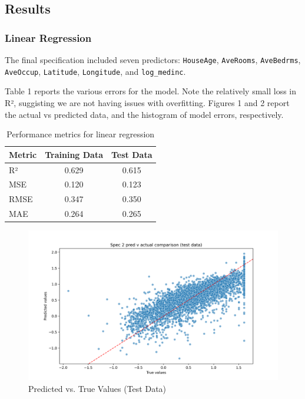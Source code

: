 \documentclass[letterpaper, 11pt]{amsart}
\begin{document}
\subsection{Results}

\subsubsection{Linear Regression}
The final specification included seven predictors: \texttt{HouseAge}, \texttt{AveRooms}, \texttt{AveBedrms}, \texttt{AveOccup}, \texttt{Latitude}, \texttt{Longitude}, and \texttt{log\_medinc}.

Table 1 reports the various errors for the model. Note the relatively small loss in R², suggisting we are not having issues with overfitting. Figures 1 and 2 report the actual vs predicted data, and the histogram of model errors, respectively.

\begin{table}[h]
\centering
\begin{tabular}{lcc}
\hline
Metric & Training Data & Test Data \\
\hline
R² & 0.629 & 0.615 \\
MSE & 0.120 & 0.123 \\
RMSE & 0.347 & 0.350 \\
MAE & 0.264 & 0.265 \\
\hline
\end{tabular}
\caption{Performance metrics for linear regression}
\end{table}

\begin{figure}[h]
\centering
\includegraphics[width=0.8\linewidth]{plots/Spec_2_pred_v_actual_test.png}
\caption{Predicted vs. True Values (Test Data)}
\end{figure}
\end{document}
